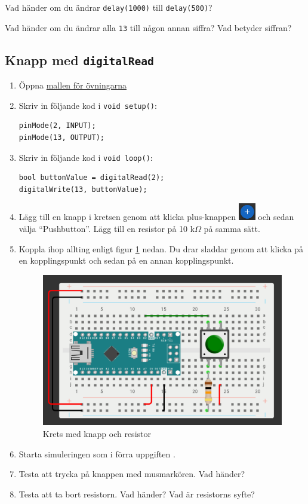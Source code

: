 \documentclass[11pt]{article}
\newcommand{\mallurl}{https://wokwi.com/projects/357812594927244289}
\begin{document}
Vad händer om du ändrar \texttt{delay(1000)} till \texttt{delay(500)}?

Vad händer om du ändrar alla \texttt{13} till någon annan siffra? Vad betyder
siffran?

\newpage
\subsection{Knapp med \texttt{digitalRead}}\label{sec:knapp}
\begin{enumerate}
      \item
            Öppna \href{\mallurl}{mallen för övningarna}
      \item
            Skriv in följande kod i \texttt{void setup()}:
            \begin{lstlisting}
pinMode(2, INPUT);
pinMode(13, OUTPUT);
            \end{lstlisting}
      \item
            Skriv in följande kod i \texttt{void loop()}:
            \begin{lstlisting}
bool buttonValue = digitalRead(2);
digitalWrite(13, buttonValue);
                  \end{lstlisting}
      \item
            Lägg till en knapp i kretsen genom att klicka plus-knappen
            \includegraphics[width=2em,valign=c]{plus} och sedan välja
            ``Pushbutton''. Lägg till en resistor på 10 k$\Omega$ på samma
            sätt.
      \item
            Koppla ihop allting enligt figur \ref{fig:knapp_setup} nedan. Du
            drar sladdar genom att klicka på en kopplingspunkt och sedan på en
            annan
            kopplingspunkt.
            \begin{figure}[H]
                  \centering
                  \includegraphics[width=.8\textwidth]{knapp_setup}
                  \caption{Krets med knapp och resistor}
                  \label{fig:knapp_setup}
            \end{figure}
      \item
            Starta simuleringen som i förra uppgiften .
      \item
            Testa att trycka på knappen med musmarkören. Vad händer?
      \item
            Testa att ta bort resistorn. Vad händer? Vad är resistorns syfte?
\end{enumerate}
\end{document}
